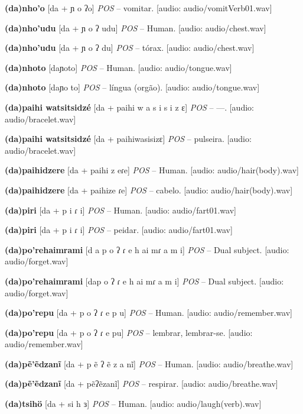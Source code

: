 \textbf{(da)nho'o} [da + ɲ o ʔo] \textit{POS} -- vomitar. [audio: audio/vomitVerb01.wav]{\faHeadphones}

\textbf{(da)nho'udu} [da + ɲ o ʔ udu] \textit{POS} -- Human. [audio: audio/chest.wav]{\faHeadphones}

\textbf{(da)nho'udu} [da + ɲ o ʔ du] \textit{POS} -- tórax. [audio: audio/chest.wav]{\faHeadphones}

\textbf{(da)nhoto} [daɲoto] \textit{POS} -- Human. [audio: audio/tongue.wav]{\faHeadphones}

\textbf{(da)nhoto} [daɲo to] \textit{POS} -- língua (orgão). [audio: audio/tongue.wav]{\faHeadphones}

\textbf{(da)paihi watsitsidzé} [da + paihi w a s i s i z ɛ] \textit{POS} -- —. [audio: audio/bracelet.wav]{\faHeadphones}

\textbf{(da)paihi watsitsidzé} [da + paihiwasisizɛ] \textit{POS} -- pulseira. [audio: audio/bracelet.wav]{\faHeadphones}

\textbf{(da)paihidzere} [da + paihi z eɾe] \textit{POS} -- Human. [audio: audio/hair(body).wav]{\faHeadphones}

\textbf{(da)paihidzere} [da + paihize ɾe] \textit{POS} -- cabelo. [audio: audio/hair(body).wav]{\faHeadphones}

\textbf{(da)piri} [da + p i ɾ i] \textit{POS} -- Human. [audio: audio/fart01.wav]{\faHeadphones}

\textbf{(da)piri} [da + p i ɾ i] \textit{POS} -- peidar. [audio: audio/fart01.wav]{\faHeadphones}

\textbf{(da)po'rehaimrami} [d a p o ʔ ɾ e h ai mɾ a m i] \textit{POS} -- Dual subject. [audio: audio/forget.wav]{\faHeadphones}

\textbf{(da)po'rehaimrami} [dap o ʔ ɾ e h ai mɾ a m i] \textit{POS} -- Dual subject. [audio: audio/forget.wav]{\faHeadphones}

\textbf{(da)po'repu} [da + p o ʔ ɾ e p u] \textit{POS} -- Human. [audio: audio/remember.wav]{\faHeadphones}

\textbf{(da)po'repu} [da + p o ʔ ɾ e pu] \textit{POS} -- lembrar, lembrar-se. [audio: audio/remember.wav]{\faHeadphones}

\textbf{(da)pẽ'ẽdzanĩ} [da + p ẽ ʔ ẽ z a nĩ] \textit{POS} -- Human. [audio: audio/breathe.wav]{\faHeadphones}

\textbf{(da)pẽ'ẽdzanĩ} [da + pẽʔẽzanĩ] \textit{POS} -- respirar. [audio: audio/breathe.wav]{\faHeadphones}

\textbf{(da)tsihö} [da + si h ɜ] \textit{POS} -- Human. [audio: audio/laugh(verb).wav]{\faHeadphones}

